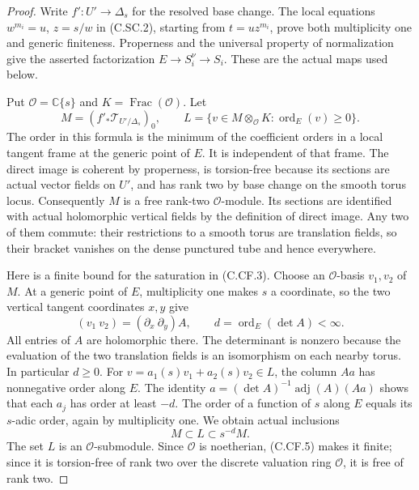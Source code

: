 \begin{proof}
Write $f':U'\to\Delta_s$ for the resolved base change.
The local equations
$w^{m_i}=u$, $z=s/w$ in (C.SC.2), starting from
$t=u z^{m_i}$, prove both multiplicity one and generic
finiteness. Properness and the universal property of normalization
give the asserted factorization $E\to S_i^\nu\to S_i$.
These are the actual maps used below.

Put $\mathcal O=\mathbb C\{s\}$ and
$K=\operatorname{Frac}(\mathcal O)$. Let
\[
 M=(f'_*\mathcal T_{U'/\Delta_s})_0,
 \qquad
 L=\{v\in M\otimes_{\mathcal O}K:
                     \operatorname{ord}_E(v)\ge0\}.
 \tag{C.CF.3}
\]
The order in this formula is the minimum of the coefficient
orders in a local tangent frame at the generic point of $E$.
It is independent of that frame. The direct image is coherent
by properness, is torsion-free because its sections are actual
vector fields on $U'$, and has rank two by base change on the
smooth torus locus. Consequently $M$ is a free rank-two
$\mathcal O$-module. Its sections are identified with actual
holomorphic vertical fields by the definition of direct image.
Any two of them commute: their restrictions to a smooth torus
are translation fields, so their bracket vanishes on the dense
punctured tube and hence everywhere.

Here is a finite bound for the saturation in (C.CF.3).
Choose an $\mathcal O$-basis $v_1,v_2$ of $M$.
At a generic point of $E$, multiplicity one makes $s$ a
coordinate, so the two vertical tangent coordinates $x,y$
give
\[
 (v_1\ v_2)=(\partial_x\ \partial_y)A,
 \qquad d=\operatorname{ord}_E(\det A)<\infty.
 \tag{C.CF.4}
\]
All entries of $A$ are holomorphic there. The determinant is
nonzero because the evaluation of the two translation fields
is an isomorphism on each nearby torus. In particular $d\ge0$.
For $v=a_1(s)v_1+a_2(s)v_2\in L$, the column $Aa$ has
nonnegative order along $E$. The identity
$a=(\det A)^{-1}\operatorname{adj}(A)(Aa)$ shows that
each $a_j$ has order at least $-d$. The order of a function
of $s$ along $E$ equals its $s$-adic order, again by
multiplicity one. We obtain actual inclusions
\[
                        M\subset L\subset s^{-d}M.
 \tag{C.CF.5}
\]
The set $L$ is an $\mathcal O$-submodule. Since $\mathcal O$
is noetherian, (C.CF.5) makes it finite; since it is torsion-free
of rank two over the discrete valuation ring $\mathcal O$,
it is free of rank two.


\end{proof}
